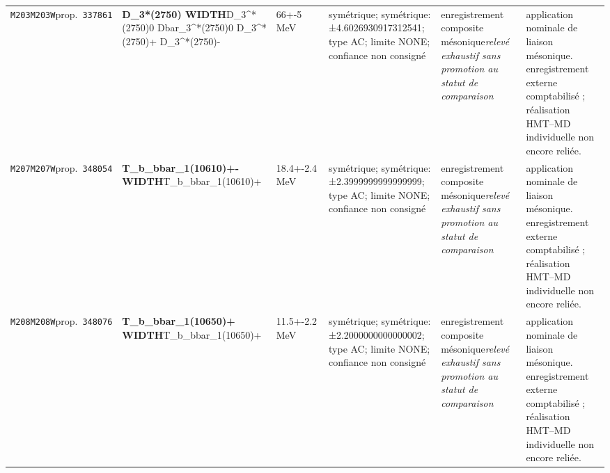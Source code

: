 \begin{landscape}
\begin{longtable}{L{1.85cm}L{4.45cm}L{2.35cm}L{4.05cm}L{3.35cm}L{7.15cm}}
\texttt{M203}\newline \texttt{M203W}\newline prop.\ \texttt{337861} & \textbf{D\_\allowbreak{}3*(2750) WIDTH}\newline D\_\allowbreak{}3\textasciicircum{}*(2750)0 \textbar{}\allowbreak{} Dbar\_\allowbreak{}3\textasciicircum{}*(2750)0 \textbar{}\allowbreak{} D\_\allowbreak{}3\textasciicircum{}*(2750)+ \textbar{}\allowbreak{} D\_\allowbreak{}3\textasciicircum{}*(2750)- & 66+-5\,MeV & symétrique; symétrique: ±4.6026930917312541; type AC; limite NONE; confiance non consigné & enregistrement composite mésonique\newline \emph{relevé exhaustif sans promotion au statut de comparaison} & application nominale de liaison mésonique. enregistrement externe comptabilisé ; réalisation HMT--MD individuelle non encore reliée. \\
\texttt{M207}\newline \texttt{M207W}\newline prop.\ \texttt{348054} & \textbf{T\_\allowbreak{}b\_\allowbreak{}bbar\_\allowbreak{}1(10610)+- WIDTH}\newline T\_\allowbreak{}b\_\allowbreak{}bbar\_\allowbreak{}1(10610)+ & 18.4+-2.4\,MeV & symétrique; symétrique: ±2.3999999999999999; type AC; limite NONE; confiance non consigné & enregistrement composite mésonique\newline \emph{relevé exhaustif sans promotion au statut de comparaison} & application nominale de liaison mésonique. enregistrement externe comptabilisé ; réalisation HMT--MD individuelle non encore reliée. \\
\texttt{M208}\newline \texttt{M208W}\newline prop.\ \texttt{348076} & \textbf{T\_\allowbreak{}b\_\allowbreak{}bbar\_\allowbreak{}1(10650)+ WIDTH}\newline T\_\allowbreak{}b\_\allowbreak{}bbar\_\allowbreak{}1(10650)+ & 11.5+-2.2\,MeV & symétrique; symétrique: ±2.2000000000000002; type AC; limite NONE; confiance non consigné & enregistrement composite mésonique\newline \emph{relevé exhaustif sans promotion au statut de comparaison} & application nominale de liaison mésonique. enregistrement externe comptabilisé ; réalisation HMT--MD individuelle non encore reliée. \\

\end{longtable}
\end{landscape}
